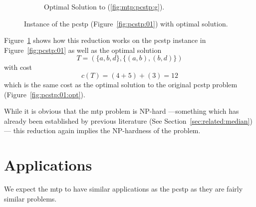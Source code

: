 \begin{figure}[h]
  \begin{subfigure}[b]{0.60\linewidth}\centering
    \caption{Optimal Solution to (\ref{fig:mtp:pcstp:g}).}
  \end{subfigure}

  \caption{Instance of the \gls{pcstp} (Figure~\ref{fig:pcstp:01}) with optimal solution.}
  \label{fig:mtp:pcstp}
\end{figure}

Figure~\ref{fig:mtp:pcstp} shows how this reduction works on the \gls{pcstp} instance in Figure~\ref{fig:pcstp:01}
as well as the optimal solution
\[T = (\{a,b,d\}, \{(a,b), (b,d)\})\]
with cost
\[c(T) = (4 + 5) + (3) = 12\]
which is the same cost as the optimal solution to the original \gls{pcstp} problem (Figure~\ref{fig:pcstp:01:opt}).

While it is obvious that the \gls{mtp} problem is NP-hard
---something which has already been established by previous literature
(See Section~\ref{sec:related:median})---
this reduction again implies the NP-hardness of the problem.
 \section{Applications}
 We expect the \acrlong{mtp} to have similar applications as the \gls{pcstp} as they are fairly similar problems.

